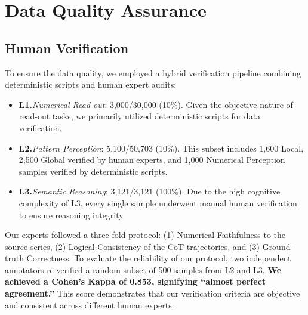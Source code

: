 \documentclass[11pt]{article}
\begin{document}
\begin{table}[t]
\centering
{}
\caption{Agreement results and Cohen's Kappa for different tasks.}
\label{tab:cohens_kappa}
\end{table}

\section{Data Quality Assurance}
\subsection{Human Verification}
To ensure the data quality, we employed a hybrid verification pipeline combining deterministic scripts and human expert audits:

\begin{itemize}[left=0pt]
    \item \textbf{L1.}\emph{Numerical Read-out}: 3,000/30,000 (10\%). Given the objective nature of read-out tasks, we primarily utilized deterministic scripts for data verification.
    \item \textbf{L2.}\emph{Pattern Perception}: 5,100/50,703 (10\%). This subset includes 1,600 Local, 2,500 Global verified by human experts, and 1,000 Numerical Perception samples verified by deterministic scripts.
    \item \textbf{L3.}\emph{Semantic Reasoning}: 3,121/3,121 (100\%). Due to the high cognitive complexity of L3, every single sample underwent manual human verification to ensure reasoning integrity.
\end{itemize}
Our experts followed a three-fold protocol: (1) Numerical Faithfulness to the source series, (2) Logical Consistency of the CoT trajectories, and (3) Ground-truth Correctness. To evaluate the reliability of our protocol, two independent annotators re-verified a random subset of 500 samples from L2 and L3. \textbf{We achieved a Cohen’s Kappa of 0.853, signifying ``almost perfect agreement.''} This score demonstrates that our verification criteria are objective and consistent across different human experts.
\end{document}
